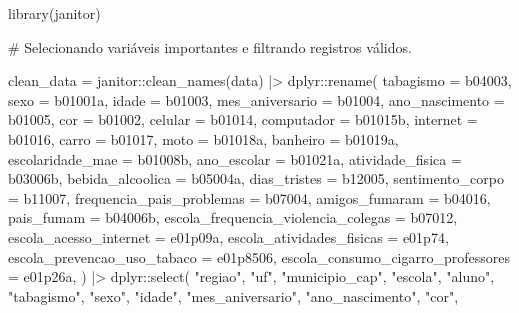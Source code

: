 \documentclass[
]{article}
\newenvironment{Shaded}{\begin{snugshade}}{\end{snugshade}}
\newcommand{\AttributeTok}[1]{\textcolor[rgb]{0.40,0.45,0.13}{#1}}
\newcommand{\CommentTok}[1]{\textcolor[rgb]{0.37,0.37,0.37}{#1}}
\newcommand{\FunctionTok}[1]{\textcolor[rgb]{0.28,0.35,0.67}{#1}}
\newcommand{\NormalTok}[1]{\textcolor[rgb]{0.00,0.23,0.31}{#1}}
\newcommand{\OtherTok}[1]{\textcolor[rgb]{0.00,0.23,0.31}{#1}}
\newcommand{\SpecialCharTok}[1]{\textcolor[rgb]{0.37,0.37,0.37}{#1}}
\newcommand{\StringTok}[1]{\textcolor[rgb]{0.13,0.47,0.30}{#1}}
\begin{document}
\begin{Shaded}
\begin{Highlighting}[]
\FunctionTok{library}\NormalTok{(janitor)}

\CommentTok{\# Selecionando variáveis importantes e filtrando registros válidos.}

\NormalTok{clean\_data }\OtherTok{=}\NormalTok{ janitor}\SpecialCharTok{::}\FunctionTok{clean\_names}\NormalTok{(data) }\SpecialCharTok{|\textgreater{}}
\NormalTok{  dplyr}\SpecialCharTok{::}\FunctionTok{rename}\NormalTok{(}
    \AttributeTok{tabagismo =}\NormalTok{ b04003,}
    \AttributeTok{sexo =}\NormalTok{ b01001a,}
    \AttributeTok{idade =}\NormalTok{ b01003,}
    \AttributeTok{mes\_aniversario =}\NormalTok{ b01004,}
    \AttributeTok{ano\_nascimento =}\NormalTok{ b01005,}
    \AttributeTok{cor =}\NormalTok{ b01002,}
    \AttributeTok{celular =}\NormalTok{ b01014,}
    \AttributeTok{computador =}\NormalTok{ b01015b,}
    \AttributeTok{internet =}\NormalTok{ b01016,}
    \AttributeTok{carro =}\NormalTok{ b01017,}
    \AttributeTok{moto =}\NormalTok{ b01018a,}
    \AttributeTok{banheiro =}\NormalTok{ b01019a,}
    \AttributeTok{escolaridade\_mae =}\NormalTok{ b01008b,}
    \AttributeTok{ano\_escolar =}\NormalTok{ b01021a,}
    \AttributeTok{atividade\_fisica =}\NormalTok{ b03006b,}
    \AttributeTok{bebida\_alcoolica =}\NormalTok{ b05004a,}
    \AttributeTok{dias\_tristes =}\NormalTok{ b12005,}
    \AttributeTok{sentimento\_corpo =}\NormalTok{ b11007,}
    \AttributeTok{frequencia\_pais\_problemas =}\NormalTok{ b07004,}
    \AttributeTok{amigos\_fumaram =}\NormalTok{ b04016,}
    \AttributeTok{pais\_fumam =}\NormalTok{ b04006b,}
    \AttributeTok{escola\_frequencia\_violencia\_colegas =}\NormalTok{ b07012,}
    \AttributeTok{escola\_acesso\_internet =}\NormalTok{ e01p09a,}
    \AttributeTok{escola\_atividades\_fisicas =}\NormalTok{ e01p74,}
    \AttributeTok{escola\_prevencao\_uso\_tabaco =}\NormalTok{ e01p8506,}
    \AttributeTok{escola\_consumo\_cigarro\_professores =}\NormalTok{ e01p26a,}
\NormalTok{  ) }\SpecialCharTok{|\textgreater{}}
\NormalTok{  dplyr}\SpecialCharTok{::}\FunctionTok{select}\NormalTok{(}
    \StringTok{"regiao"}\NormalTok{,}
    \StringTok{"uf"}\NormalTok{,}
    \StringTok{"municipio\_cap"}\NormalTok{,}
    \StringTok{"escola"}\NormalTok{,}
    \StringTok{"aluno"}\NormalTok{,}
    \StringTok{"tabagismo"}\NormalTok{,}
    \StringTok{"sexo"}\NormalTok{,}
    \StringTok{"idade"}\NormalTok{,}
    \StringTok{"mes\_aniversario"}\NormalTok{,}
    \StringTok{"ano\_nascimento"}\NormalTok{,}
    \StringTok{"cor"}\NormalTok{,}

\end{Highlighting}
\end{Shaded}
\end{document}

